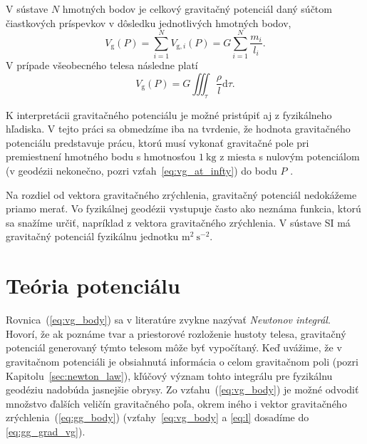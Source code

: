\documentclass[a4paper, 12pt]{book}
\newcommand{\diff}{\mathrm d}
\newcommand{\gidx}{\mathrm g}
\begin{document}
V sústave $N$ hmotných bodov je celkový gravitačný potenciál daný súčtom 
čiastkových príspevkov v dôsledku jednotlivých hmotných bodov,
%
\begin{equation}
V_\gidx(P) = \sum_{i = 1}^{N} V_{\gidx,i}(P) = G \sum_{i = 1}^{N}\frac{
m_i}{l_i}{.}
\end{equation}
%
V prípade všeobecného telesa následne platí
%
\begin{equation}
\label{eq:vg_body}
V_\gidx(P) = G \iiint_{\tau} \frac{\rho}{l} \diff\tau{.}
\end{equation}

K interpretácii gravitačného potenciálu je možné pristúpiť aj z fyzikálneho 
hľadiska.  V tejto práci sa obmedzíme iba na tvrdenie, že hodnota gravitačného 
potenciálu predstavuje prácu, ktorú musí vykonať gravitačné pole pri 
premiestnení hmotného bodu s hmotnosťou $1\ \mathrm{kg}$ z miesta s nulovým 
potenciálom (v geodézii nekonečno, pozri vzťah~\ref{eq:vg_at_infty}) do bodu $P$ 
\citep{MacMillan1930,Kellogg1967,TorgeGeodesy}.

Na rozdiel od vektora gravitačného zrýchlenia, gravitačný potenciál nedokážeme 
priamo merať.  Vo fyzikálnej geodézii vystupuje často ako neznáma funkcia, 
ktorú sa snažíme určiť, napríklad z vektora gravitačného zrýchlenia.  V sústave 
SI má gravitačný potenciál fyzikálnu jednotku $\mathrm{m}^2\ \mathrm{s}^{-2}$.







\section{Teória potenciálu}

Rovnica~(\ref{eq:vg_body}) sa v literatúre zvykne nazývať \emph{Newtonov 
integrál}.  Hovorí, že ak poznáme tvar a priestorové rozloženie hustoty telesa, 
gravitačný potenciál generovaný týmto telesom môže byť vypočítaný.  Keď 
uvážime, že v gravitačnom potenciáli je obsiahnutá informácia o celom 
gravitačnom poli (pozri Kapitolu~\ref{sec:newton_law}), kľúčový význam tohto 
integrálu pre fyzikálnu geodéziu nadobúda jasnejšie obrysy.  Zo 
vzťahu~(\ref{eq:vg_body}) je možné odvodiť množstvo ďalších veličín 
gravitačného poľa, okrem iného i vektor gravitačného 
zrýchlenia~(\ref{eq:gg_body}) (vzťahy~\ref{eq:vg_body} a \ref{eq:l} dosadíme do 
\ref{eq:gg_grad_vg}).
\end{document}
